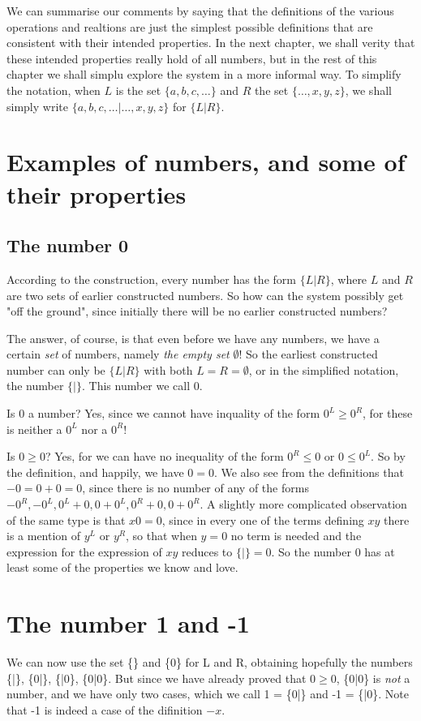 \documentclass[10pt,a4paper]{book}
\begin{document}
We can summarise our comments by saying that the definitions of the various operations and realtions are just the simplest possible definitions that are consistent with their intended properties. In the next chapter, we shall verity that these intended properties really hold of all numbers, but in the rest of this chapter we shall simplu explore the system in a more informal way. To simplify the notation, when $ L $ is the set $ \{a, b, c, \dots \} $ and $ R $ the set $ \{ \dots, x,y,z \} $, we shall simply write $ \{ a, b, c, \dots | \dots, x, y, z \} $ for $ \{ L|R \} $.

\section{Examples of numbers, and some of their properties}
\subsection{The number 0}
According to the construction, every number has the form $ \{ L|R \} $, where $ L $ and $ R $ are two sets of earlier constructed numbers. So how can the system possibly get "off the ground", since initially there will be no earlier constructed numbers?

The answer, of course, is that even before we have any numbers, we have a certain \textit{set} of numbers, namely \textit{the empty set} $ \emptyset $! So the earliest constructed number can only be $ \{L|R\} $ with both $ L=R=\emptyset $, or in the simplified notation, the number $ \{|\} $. This number we call 0.

Is 0 a number? Yes, since we cannot have inquality of the form $ 0^L\ge 0^R $, for these is neither a $ 0^L $ nor a $ 0^R $!

Is $ 0\ge 0 $? Yes, for we can have no inequality of the form $ 0^R \le 0 $ or $ 0\le 0^L $. So by the definition, and happily, we have $ 0=0 $. We also see from the definitions that $ -0=0+0=0 $, since there is no number of any of the forms $ -0^R, -0^L, 0^L+0, 0+0^L, 0^R+0, 0+0^R $. A slightly more complicated observation of the same type is that $ x0=0 $, since in every one of the terms defining $ xy $ there is a mention of $ y^L $ or $ y^R $, so that when $ y=0 $ no term is needed and the expression for the expression of $ xy $ reduces to $ \{|\} =0 $. So the number 0 has at least some of the properties we know and love. 

\section{The number 1 and -1}
We can now use the set \{\} and \{0\} for L and R, obtaining hopefully the numbers \{|\}, \{0|\}, \{|0\}, \{0|0\}. But since we have already proved that $ 0\ge 0 $, \{0|0\} is \textit{not} a number, and we have only two cases, which we call 1 = \{0|\} and -1 = \{|0\}. Note that -1 is indeed a case of the difinition $ -x $.
\end{document}
